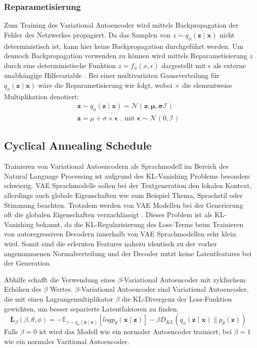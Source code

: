 \subsubsection{Reparametisierung} %
Zum Training des Variational Autoencoder wird mittels Backpropagation der Fehler des Netzwerkes propagiert. Da das Samplen von $z \sim q_\phi(\mathbf{z\mid x})$ nicht deterministisch ist, kann hier keine Backpropagation durchgeführt werden.
Um dennoch Backpropagation verwenden zu können wird mittels Reparametisierung $z$ durch eine deterministische Funktion $z=f_\phi(x,\epsilon)$ dargestellt mit $\epsilon$ als externe unabhängige Hilfsvariable \citep{kingma2014autoencoding,jordan_2018}. 
Bei einer multivariaten Gaussverteilung für $q_\phi (\mathbf{z\mid x})$ wäre die Reparametisierung wie folgt, wobei $\times$ die elementweise Multiplikation denotiert:
\begin{align}
    \mathbf{z} \sim q_\phi(\mathbf{z\mid x}) = \mathcal{N}(\mathbf{z;\mu,\sigma \mathcal{I}}) \nonumber \\
    \mathbf{z} = \mu + \sigma \times \mathbf{\epsilon} \text{ , mit } \mathbf{\epsilon} \sim \mathcal{N}(0,\mathcal{I}) 
\end{align}

\subsection{Cyclical Annealing Schedule}
\label{cyc_anneal}
Trainieren von Variational Autoencodern als Sprachmodell im Bereich des Natural Language Processing ist aufgrund des KL-Vanishing Problems besonders schwierig.
VAE Sprachmodelle sollen bei der Textgeneration den lokalen Kontext, allerdings auch globale Eigenschaften wie zum Beispiel Thema, Sprachstil oder Stimmung beachten. 
Trotzdem werden von VAE Modellen bei der Generierung oft die globalen Eigenschaften vernachlässigt \citep{cyc_anneal}. 
Dieses Problem ist als KL-Vanishing bekannt, da die KL-Regularisierung des Loss-Terms beim Trainieren von autoregressiven Decodern innerhalb von VAE Sprachmodellen sehr klein wird.
Somit sind die erlernten Features nahezu identisch zu der vorher angenommenen Normalverteilung und der Decoder nutzt keine Latentfeatures bei der Generation. %

Abhilfe schafft die Verwendung eines $\beta$-Variational Autoencoder \citep{cyc_anneal} mit zyklischem Erhöhen des $\beta$ Wertes.
$\beta$-Variational Autoencoder sind Variational Autoencoder, die mit einen Lagrangemultiplikator $\beta$ die KL-Divergenz der Loss-Funktion gewichten, um besser separierte Latentfaktoren zu finden.
\begin{equation}
    \mathbf{L}_{\beta} (\beta,\theta,\phi)= -\mathbb{E}_{z\sim q_\phi(\mathbf{z\mid x})}[log p_\theta (\mathbf{x\mid z})]- \beta D_{KL}(q_\phi(\mathbf{z\mid x}) \parallel p_\theta(\mathbf{z})) 
\end{equation}
Falls $\beta = 0$ ist wird das Modell wie ein normaler Autoencoder trainiert, bei $\beta = 1$ wie ein normaler Varitional Autoencoder.

